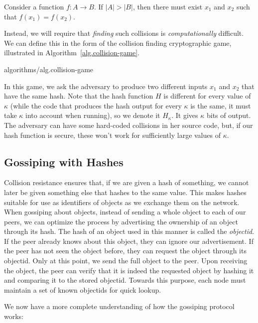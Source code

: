 \begin{theorem}[Pigeonhole]
  Consider a function $f: A \longrightarrow B$. If $|A| > |B|$, then there must
  exist $x_1$ and $x_2$ such that $f(x_1) = f(x_2)$.
\end{theorem}

Instead, we will require that \emph{finding} such collisions is \emph{computationally}
difficult. We can define this in the form of the collision finding cryptographic game,
illustrated in Algorithm~\ref{alg.collision-game}.

{algorithms/alg.collision-game}

In this game, we ask the adversary to produce two different inputs $x_1$ and $x_2$
that have the same hash. Note that the hash function $H$ is different
for every value of $\kappa$ (while the code that produces the hash output for every
$\kappa$ is the same, it must take $\kappa$ into account when running), so we
denote it $H_\kappa$. It gives $\kappa$ bits of output. The adversary can have some
hard-coded collisions in her source code, but, if our hash function is secure, these won't work for
sufficiently large values of $\kappa$.

\subsection*{Gossiping with Hashes}

Collision resistance ensures that, if we are given a hash of something, we cannot
later be given something else that hashes to the same value. This makes hashes suitable
for use as identifiers of objects as we exchange them on the network. When gossiping
about objects, instead of sending a whole object to each of our peers, we can optimize
the process by advertising the ownership of an object through its hash. The hash of
an object used in this manner is called the \emph{objectid}. If the peer already knows
about this object, they can ignore our advertisement. If the peer has not seen the
object before, they can request the object through its objectid. Only at this point, we
send the full object to the peer. Upon receiving the object, the peer can verify that
it is indeed the requested object by hashing it and comparing it to the stored objectid.
Towards this purpose, each node must maintain a set of known objectids for quick lookup.

We now have a more complete understanding of how the gossiping protocol works:


